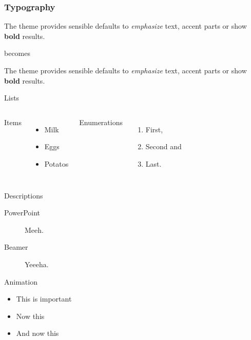 \documentclass[10pt, compress]{beamer}
\begin{document}
\begin{frame}[fragile]
  \frametitle{Typography}

The theme provides sensible defaults to \emph{emphasize}
text, \alert{accent} parts or show \textbf{bold} results.


  \begin{center}becomes\end{center}

  The theme provides sensible defaults to \emph{emphasize} text,
  \alert{accent} parts or show \textbf{bold} results.
\end{frame}
\begin{frame}{Lists}
  \begin{columns}[onlytextwidth]
      Items
      \begin{itemize}
        \item Milk \item Eggs \item Potatos
      \end{itemize}

      Enumerations
      \begin{enumerate}
        \item First, \item Second and \item Last.
      \end{enumerate}
  \end{columns}
\end{frame}
\begin{frame}{Descriptions}
  \begin{description}
    \item[PowerPoint] Meeh.
    \item[Beamer] Yeeeha.
  \end{description}
\end{frame}
\begin{frame}{Animation}
  \begin{itemize}[<+- | alert@+>]
    \item \alert<4>{This is important}
    \item Now this
    \item And now this
  \end{itemize}
\end{frame}
\end{document}
